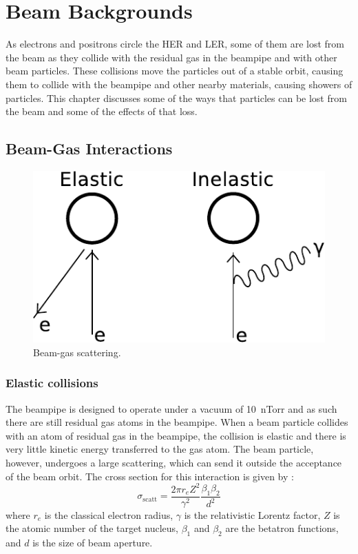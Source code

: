 \chapter{Beam Backgrounds}
\label{chap:beamBack}

	As electrons and positrons circle the HER and LER, some of them are lost from the beam as they collide with the residual gas in the beampipe and with other beam particles. These collisions move the particles out of a stable orbit, causing them to collide with the beampipe and other nearby materials, causing showers of particles. This chapter discusses some of the ways that particles can be lost from the beam and some of the effects of that loss.


\section{Beam-Gas Interactions}
\label{sec:beamGas}

\begin{figure}[htb]
	\centerfloat
		\includegraphics{images/beambeamCartoon}
	\caption[Beam-gas scattering]{Beam-gas scattering.}		
	\label{fig:BGasScat}
\end{figure}


\subsection{Elastic collisions}

	The beampipe is designed to operate under a vacuum of 10~nTorr and as such there are still residual gas atoms in the beampipe. When a beam particle collides with an atom of residual gas in the beampipe, the collision is elastic and there is very little kinetic energy transferred to the gas atom. The beam particle, however, undergoes a large scattering, which can send it outside the acceptance of the beam orbit. The cross section for this interaction is given by \cite{moller1999beam, Marin:1999ss}:
\begin{equation}
	{\sigma_{\mathrm{scatt}}=\frac{2\pi r_eZ^2}{\gamma^2}\frac{\beta_1\beta_2}{d^2}}
	\label{eqn:coulomb}
\end{equation}
where $r_{e}$ is the classical electron radius, $\gamma$ is the relativistic Lorentz factor, $Z$ is the atomic number of the target nucleus, $\beta_1$ and $\beta_2$ are the betatron functions, and $d$ is the size of beam aperture.


